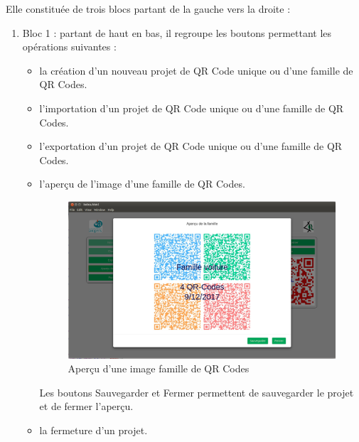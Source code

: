 \par
Elle constituée de trois blocs partant de la gauche vers la droite : 
\begin{enumerate}
\item Bloc 1 : partant de haut en bas, il regroupe les boutons permettant les opérations suivantes :
	\begin{itemize}
	\item la création d'un nouveau projet de QR Code unique ou d'une famille de QR Codes.
	\item l'importation d'un projet de QR Code unique ou d'une famille de QR Codes.
	\item l'exportation d'un projet de QR Code unique ou d'une famille de QR Codes.
	\item l'aperçu de l'image d'une famille de QR Codes.

\begin{figure}[!h]
			\centering
		   	\includegraphics[scale=0.25]{img/image-famille.png}
		   	\caption{Aperçu d'une image famille de QR Codes}
		\end{figure}
	
	Les boutons Sauvegarder et Fermer permettent de sauvegarder le projet et de fermer l'aperçu.\\
	\item la fermeture d'un projet.
	\end{itemize}
	

\end{enumerate}
